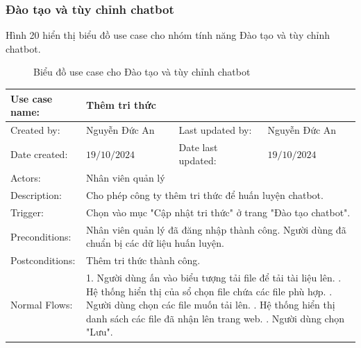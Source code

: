 \subsubsection{Đào tạo và tùy chỉnh chatbot}
Hình 20 hiển thị biểu đồ use case cho nhóm tính năng Đào tạo và tùy chỉnh chatbot.
\begin{figure}[H]
    \centering
     
    \vspace{0.5cm}
    \caption{Biểu đồ use case cho Đào tạo và tùy chỉnh chatbot}
    \label{fig:enter-label}
\end{figure}


\begin{table}[H]
	\centering
	\begin{tabular}{|l|l|l|l|} 
		\hline Use case name: & \multicolumn{3}{|l|}{Thêm tri thức} \\ 
		\hline Created by: & Nguyễn Đức An & Last updated by: & Nguyễn Đức An \\ 
		\hline Date created: & $19 / 10 / 2024$ & Date last updated: & $19 / 10 / 2024$\\ 
		\hline Actors: & \multicolumn{3}{|l|}{Nhân viên quản lý} \\ 
		\hline Description: & \multicolumn{3}{|p{12cm}|}{ Cho phép công ty thêm tri thức để huấn luyện chatbot. } \\ 
		\hline Trigger: & \multicolumn{3}{|p{12cm}|}{ Chọn vào mục "Cập nhật tri thức" ở trang "Đào tạo chatbot". } \\ 
		\hline Preconditions: & \multicolumn{3}{|p{12cm}|}{ 
			Nhân viên quản lý đã đăng nhập thành công. \newline 
			Người dùng đã chuẩn bị các dữ liệu huấn luyện. 
		} \\ 
		\hline Postconditions: & \multicolumn{3}{|p{12cm}|}{ Thêm tri thức thành công. } \\ 
		\hline Normal Flows: & \multicolumn{3}{|p{12cm}|}{ 
			1. Người dùng ấn vào biểu tượng tải file để tải tài liệu lên. \newline 
			2. Hệ thống hiển thị của sổ chọn file chứa các file phù hợp. \newline 
            3. Người dùng chọn các file muốn tải lên. \newline 
			4. Hệ thống hiển thị danh sách các file đã nhận lên trang web.  \newline
            5. Người dùng chọn "Lưu". \newline
}
\end{tabular}
\end{table}
